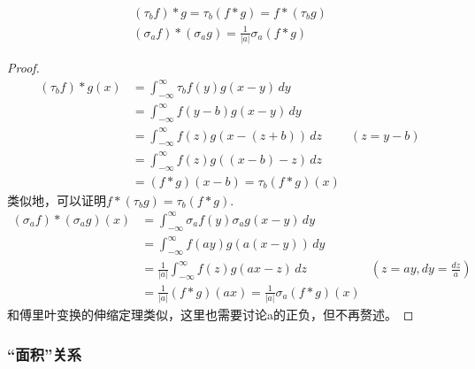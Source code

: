\begin{proposition}
    \label{prop:conv_signal_shift}
    \begin{align*}
        (\tau_b f)*g=\tau_b (f*g)=f*(\tau_b g) \\
        (\sigma_a f)*(\sigma_a g)=\frac{1}{|a|}\sigma_a(f*g)
    \end{align*}
\end{proposition}
\begin{proof}
    \begin{align*}
        (\tau_b f)*g(x) & =\int_{-\infty}^{\infty}\tau_b f(y)g(x-y)\,dy           \\
                        & =\int_{-\infty}^{\infty}f(y-b)g(x-y)\,dy                \\
                        & =\int_{-\infty}^{\infty}f(z)g(x-(z+b))\,dz    & (z=y-b) \\
                        & =\int_{-\infty}^{\infty}f(z)g((x-b)-z)\,dz              \\
                        & =(f*g)(x-b)=\tau_b (f*g)(x)
    \end{align*}
    类似地，可以证明$f*(\tau_b g)=\tau_b (f*g)$.
    \begin{align*}
        (\sigma_a f)*(\sigma_a g)(x) & =\int_{-\infty}^{\infty}\sigma_a f(y)\sigma_a g(x-y)\,dy                                     \\
                                     & =\int_{-\infty}^{\infty}f(ay)g(a(x-y))\,dy                                                   \\
                                     & =\frac{1}{|a|}\int_{-\infty}^{\infty}f(z)g(a x - z)\,dz  & \left(z=ay,dy=\frac{dz}{a}\right) \\
                                     & =\frac{1}{|a|}(f*g)(a x)=\frac{1}{|a|}\sigma_a(f*g)(x)
    \end{align*}
    和傅里叶变换的伸缩定理类似，这里也需要讨论a的正负，但不再赘述。
\end{proof}

\subsubsection{“面积”关系}

